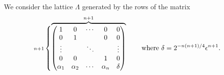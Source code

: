 We consider the lattice $\Lambda$ generated by the rows of the matrix
\[ \text{\begin{scriptsize}$n\mathord+1$\end{scriptsize}} \left\{ \vphantom{\begin{pmatrix}
1        & 0 & \cdots & 0 & 0 \\
0        & 1 &        & 0 & 0 \\
\vdots   &   & \ddots &   & \vdots \\
0        & 0 &        & 1 & 0 \\
\alpha_1 & \alpha_2 & \cdots & \alpha_n & \delta 
\end{pmatrix}} \smash{\overbrace{\begin{pmatrix}
1        & 0 & \cdots & 0 & 0 \\
0        & 1 &        & 0 & 0 \\
\vdots   &   & \ddots &   & \vdots \\
0        & 0 &        & 1 & 0 \\
\alpha_1 & \alpha_2 & \cdots & \alpha_n & \delta 
\end{pmatrix}}^{n+1}} \right. \vphantom{\overbrace{\begin{pmatrix}
1        & 0 & \cdots & 0 & 0 \\
0        & 1 &        & 0 & 0 \\
\vdots   &   & \ddots &   & \vdots \\
0        & 0 &        & 1 & 0 \\
\alpha_1 & \alpha_2 & \cdots & \alpha_n & \delta 
\end{pmatrix}}^{n+1}} \qquad\text{where $\delta=2^{-n(n+1)/4}\epsilon^{n+1}$} . \]
